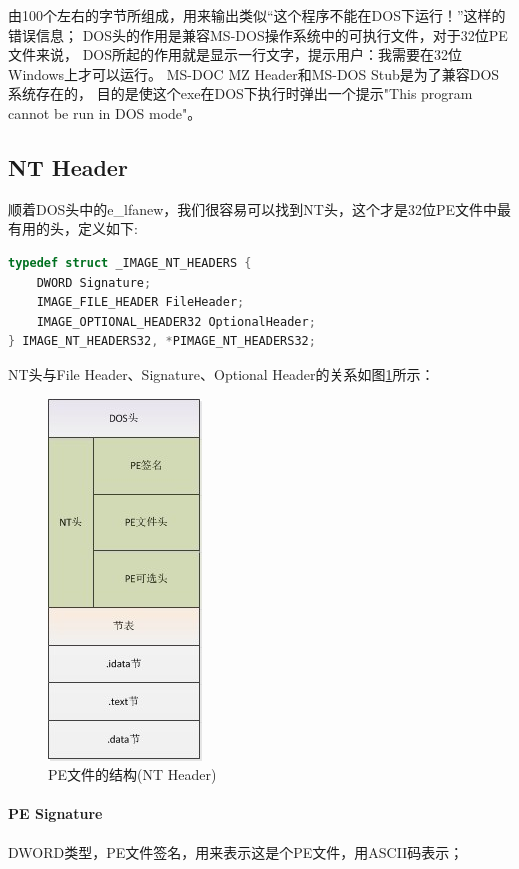 \documentclass{book}
\begin{document}
由100个左右的字节所组成，用来输出类似“这个程序不能在DOS下运行！”这样的错误信息；
DOS头的作用是兼容MS-DOS操作系统中的可执行文件，对于32位PE文件来说，
DOS所起的作用就是显示一行文字，提示用户：我需要在32位Windows上才可以运行。
MS-DOC MZ Header和MS-DOS Stub是为了兼容DOS系统存在的，
目的是使这个exe在DOS下执行时弹出一个提示"This program cannot be run in DOS mode"。

\subsection{NT Header}

顺着DOS头中的e\_lfanew，我们很容易可以找到NT头，这个才是32位PE文件中最有用的头，定义如下:

\begin{lstlisting}[language=C]
typedef struct _IMAGE_NT_HEADERS {  
    DWORD Signature;  
    IMAGE_FILE_HEADER FileHeader;  
    IMAGE_OPTIONAL_HEADER32 OptionalHeader;  
} IMAGE_NT_HEADERS32, *PIMAGE_NT_HEADERS32; 
\end{lstlisting}

NT头与File Header、Signature、Optional  Header的关系如图\ref{fig:PEFileStructureWithNTHeader}所示：

\begin{figure}[htbp]
	\centering
	\includegraphics[scale=1]{PEFileStructureWithNTHeader.jpg}
	\caption{PE文件的结构(NT Header)}
	\label{fig:PEFileStructureWithNTHeader}
\end{figure}

\paragraph{PE Signature}DWORD类型，PE文件签名，用来表示这是个PE文件，用ASCII码表示；
\end{document}

